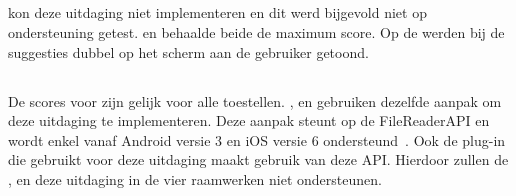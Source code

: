 \subsection{}
\label{sec:evaluatie-ondersteuning-autoaanvullen}

\st{} kon deze uitdaging niet implementeren en dit werd bijgevold niet op ondersteuning getest.
\kendo{} en \jqm{} behaalde beide de maximum score.
Op de \htc{} werden bij \lungo{} de suggesties dubbel op het scherm aan de gebruiker getoond.

% 
% 
% 

\subsection{}
\label{sec:evaluatie-ondersteuning-afbeelding}

De scores voor  zijn gelijk voor alle toestellen.
\kendo{}, \jqm{} en \lungo{} gebruiken dezelfde aanpak om deze uitdaging te implementeren.
Deze aanpak steunt op de FileReaderAPI en wordt enkel vanaf Android versie 3 en iOS versie 6 ondersteund~\cite{Deveria2013c}.
Ook de plug-in die \st{} gebruikt voor deze uitdaging maakt gebruik van deze API.
Hierdoor zullen de \htc{},  \gtab{} en \ipadi{} deze uitdaging in de vier raamwerken niet ondersteunen.

